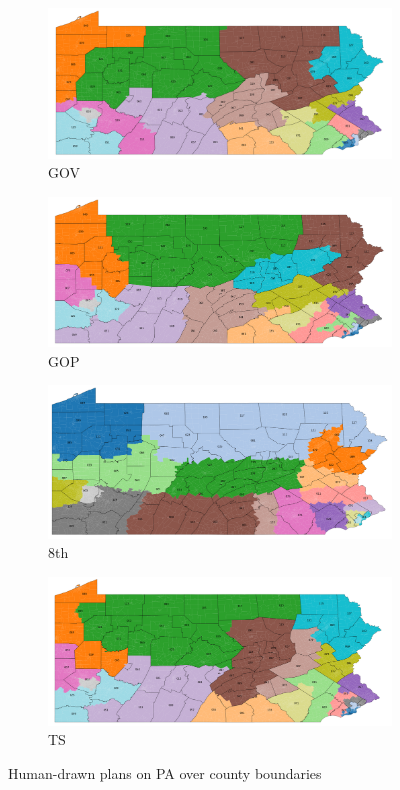\documentclass{mgggarticle}
\begin{document}
\begin{figure}[h]
\begin{subfigure}{0.475\textwidth}
\includegraphics[width=\textwidth]{GOV_counties.png}
\caption{GOV}
\end{subfigure}
\begin{subfigure}{0.475\textwidth}
\includegraphics[width=\textwidth]{GOP_counties.png}
\caption{GOP}
\end{subfigure}

\begin{subfigure}{0.475\textwidth}
\includegraphics[width=\textwidth]{8th_counties.png}
\caption{8th}
\end{subfigure}
\begin{subfigure}{0.475\textwidth}
\includegraphics[width=\textwidth]{TS_counties.png}
\caption{TS}
\end{subfigure}

\caption{Human-drawn plans on PA over county boundaries}
\end{figure}
\end{document}
